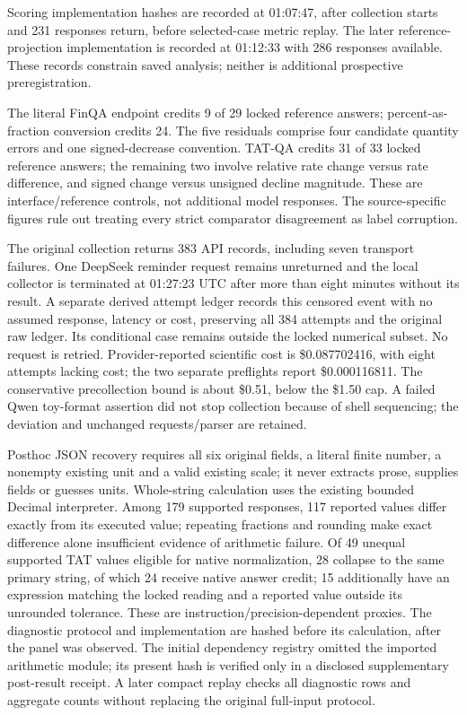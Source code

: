 Scoring implementation hashes are recorded at 01:07:47, after collection starts and 231 responses return, before selected-case metric replay. The later reference-projection implementation is recorded at 01:12:33 with 286 responses available. These records constrain saved analysis; neither is additional prospective preregistration.

The literal FinQA endpoint credits 9 of 29 locked reference answers; percent-as-fraction conversion credits 24. The five residuals comprise four candidate quantity errors and one signed-decrease convention. TAT-QA credits 31 of 33 locked reference answers; the remaining two involve relative rate change versus rate difference, and signed change versus unsigned decline magnitude. These are interface/reference controls, not additional model responses. The source-specific figures rule out treating every strict comparator disagreement as label corruption.

The original collection returns 383 API records, including seven transport failures. One DeepSeek reminder request remains unreturned and the local collector is terminated at 01:27:23 UTC after more than eight minutes without its result. A separate derived attempt ledger records this censored event with no assumed response, latency or cost, preserving all 384 attempts and the original raw ledger. Its conditional case remains outside the locked numerical subset. No request is retried. Provider-reported scientific cost is \$0.087702416, with eight attempts lacking cost; the two separate preflights report \$0.000116811. The conservative precollection bound is about \$0.51, below the \$1.50 cap. A failed Qwen toy-format assertion did not stop collection because of shell sequencing; the deviation and unchanged requests/parser are retained.

Posthoc JSON recovery requires all six original fields, a literal finite number, a nonempty existing unit and a valid existing scale; it never extracts prose, supplies fields or guesses units. Whole-string calculation uses the existing bounded Decimal interpreter. Among 179 supported responses, 117 reported values differ exactly from its executed value; repeating fractions and rounding make exact difference alone insufficient evidence of arithmetic failure. Of 49 unequal supported TAT values eligible for native normalization, 28 collapse to the same primary string, of which 24 receive native answer credit; 15 additionally have an expression matching the locked reading and a reported value outside its unrounded tolerance. These are instruction/precision-dependent proxies. The diagnostic protocol and implementation are hashed before its calculation, after the panel was observed. The initial dependency registry omitted the imported arithmetic module; its present hash is verified only in a disclosed supplementary post-result receipt. A later compact replay checks all diagnostic rows and aggregate counts without replacing the original full-input protocol.


